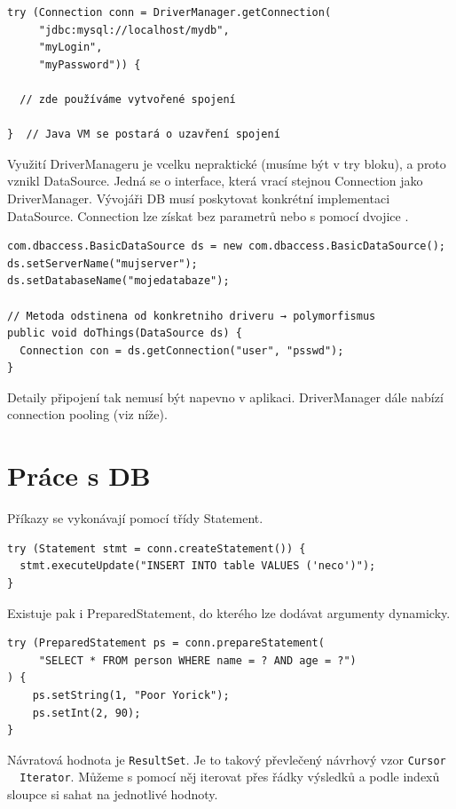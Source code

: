 \documentclass{szzclass}
\begin{document}
\begin{verbatim}
try (Connection conn = DriverManager.getConnection(
     "jdbc:mysql://localhost/mydb",
     "myLogin",
     "myPassword")) {

  // zde používáme vytvořené spojení

}  // Java VM se postará o uzavření spojení
\end{verbatim}


Využití DriverManageru je vcelku nepraktické (musíme být v try bloku), a proto vznikl DataSource. Jedná se o interface, která vrací stejnou Connection jako DriverManager. Vývojáři DB musí poskytovat konkrétní implementaci DataSource. Connection lze získat bez parametrů nebo s pomocí dvojice .

\begin{verbatim}
com.dbaccess.BasicDataSource ds = new com.dbaccess.BasicDataSource();
ds.setServerName("mujserver");
ds.setDatabaseName("mojedatabaze");

// Metoda odstinena od konkretniho driveru → polymorfismus
public void doThings(DataSource ds) {
  Connection con = ds.getConnection("user", "psswd");
}
\end{verbatim}

Detaily připojení tak nemusí být napevno v aplikaci. DriverManager dále nabízí connection pooling (viz níže).

\section{Práce s DB}
Příkazy se vykonávají pomocí třídy Statement.

\begin{verbatim}
try (Statement stmt = conn.createStatement()) {
  stmt.executeUpdate("INSERT INTO table VALUES ('neco')");
}
\end{verbatim}

Existuje pak i PreparedStatement, do kterého lze dodávat argumenty dynamicky.

\begin{verbatim}
try (PreparedStatement ps = conn.prepareStatement(
     "SELECT * FROM person WHERE name = ? AND age = ?")
) {
    ps.setString(1, "Poor Yorick");
    ps.setInt(2, 90);
}
\end{verbatim}

Návratová hodnota je \texttt{ResultSet}. Je to takový převlečený návrhový vzor \texttt{Cursor ~ Iterator}.
Můžeme s pomocí něj iterovat přes řádky výsledků a podle indexů sloupce si sahat na jednotlivé hodnoty.
\end{document}
